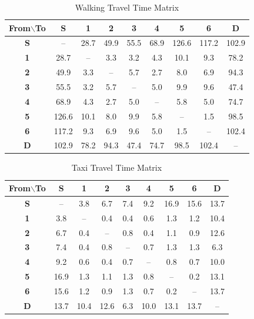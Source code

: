 \begin{table}[t]
	\centering
	\resizebox{\columnwidth}{!}
	{
		\begin{tabular}{c|cccccccc}
			\toprule
			\textbf{From$\backslash$To} & \textbf{S} & \textbf{1} & \textbf{2} & \textbf{3} & \textbf{4} & \textbf{5} & \textbf{6} & \textbf{D} \\
			\midrule
			\textbf{S} & --    & 28.7  & 49.9  & 55.5  & 68.9  & 126.6 & 117.2 & 102.9 \\
			\textbf{1} & 28.7  & --    & 3.3   & 3.2   & 4.3   & 10.1  & 9.3   & 78.2  \\
			\textbf{2} & 49.9  & 3.3   & --    & 5.7   & 2.7   & 8.0   & 6.9   & 94.3  \\
			\textbf{3} & 55.5  & 3.2   & 5.7   & --    & 5.0   & 9.9   & 9.6   & 47.4  \\
			\textbf{4} & 68.9  & 4.3   & 2.7   & 5.0   & --    & 5.8   & 5.0   & 74.7  \\
			\textbf{5} & 126.6 & 10.1  & 8.0   & 9.9   & 5.8   & --    & 1.5   & 98.5  \\
			\textbf{6} & 117.2 & 9.3   & 6.9   & 9.6   & 5.0   & 1.5   & --    & 102.4 \\
			\textbf{D} & 102.9 & 78.2  & 94.3  & 47.4  & 74.7  & 98.5  & 102.4 & --    \\
			\bottomrule
		\end{tabular}
	}
	\caption{Walking Travel Time Matrix}
	\label{tab:example_walk}
\end{table}

\begin{table}[t]
	\centering
	\resizebox{\columnwidth}{!}
	{
		\begin{tabular}{c|cccccccc}
			\toprule
			\textbf{From$\backslash$To} & \textbf{S} & \textbf{1} & \textbf{2} & \textbf{3} & \textbf{4} & \textbf{5} & \textbf{6} & \textbf{D} \\
			\midrule
			\textbf{S} & --    & 3.8  & 6.7  & 7.4  & 9.2  & 16.9 & 15.6 & 13.7 \\
			\textbf{1} & 3.8   & --   & 0.4  & 0.4  & 0.6  & 1.3  & 1.2  & 10.4 \\
			\textbf{2} & 6.7   & 0.4  & --   & 0.8  & 0.4  & 1.1  & 0.9  & 12.6 \\
			\textbf{3} & 7.4   & 0.4  & 0.8  & --   & 0.7  & 1.3  & 1.3  & 6.3  \\
			\textbf{4} & 9.2   & 0.6  & 0.4  & 0.7  & --   & 0.8  & 0.7  & 10.0 \\
			\textbf{5} & 16.9  & 1.3  & 1.1  & 1.3  & 0.8  & --   & 0.2  & 13.1 \\
			\textbf{6} & 15.6  & 1.2  & 0.9  & 1.3  & 0.7  & 0.2  & --   & 13.7 \\
			\textbf{D} & 13.7  & 10.4 & 12.6 & 6.3  & 10.0 & 13.1 & 13.7 & --   \\
			\bottomrule
		\end{tabular}
	}
	\caption{Taxi Travel Time Matrix}
	\label{tab:example_taxi}
\end{table}

